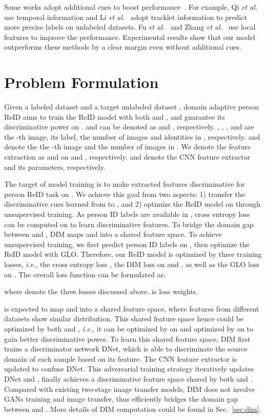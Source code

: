\documentclass[sigconf]{acmart}
\begin{document}
Some works adopt additional cues to boost performance~\cite{Qi_2019_ICCV, li2019unsupervised-pami, li2018unsupervised,ssg, Zhang_2019_ICCV}. For example, Qi \textit{et al.}~\cite{Qi_2019_ICCV} use temporal information and
Li \textit{et al.}~\cite{li2019unsupervised-pami, li2018unsupervised} adopt tracklet information to predict more precise labels on unlabeled datasets. Fu \textit{et al.}~\cite{ssg} and Zhang \textit{et al.}~\cite{Zhang_2019_ICCV} use local features to improve the performance. 
Experimental results show that our model outperforms these methods by a clear margin even without additional cues.



\section{Problem Formulation}
Given a labeled dataset  and a target unlabeled dataset , domain adaptive person ReID aims to train the ReID model with both  and , and guarantee its discriminative power on .  and  can be denoted as  and , respectively. , , , and  are the -th image, its label, the number of images and identities in , respectively.  and  denote the the -th image and the number of images in . We denote the feature extraction as  and  on  and , respectively.  and  denote the CNN feature extractor and its parameters, respectively.

The target of model training is to make extracted features discriminative for person ReID task on . We achieve this goal from two aspects: 1) transfer the discriminative cues learned from  to , and 2) optimize the ReID model on  through unsupervised training. As person ID labels are available in , cross entropy loss  can be computed on  to learn discriminative features. To bridge the domain gap between  and , DIM maps  and  into a shared feature space. To achieve unsupervised training, we first predict person ID labels on , then optimize the ReID model with GLO. Therefore, our ReID model is optimized by three training losses, \emph{i.e.}, the cross entropy loss , the DIM loss on  and , as well as the GLO loss on . The overall loss function can be formulated as:

where  denote the three losses discussed above.  is loss weights.


 is expected to map  and  into a shared feature space, where features from different datasets show similar distribution. This shared feature space hence could be optimized by both  and , \emph{i.e.}, it can be optimized by  on  and optimized by  on  to gain better discriminative power. To learn this shared feature space, DIM first trains a discriminator network DNet, which is able to discriminate the source domain of each sample based on its feature. The CNN feature extractor  is updated to confuse DNet. This adversarial training strategy iteratively updates DNet and , finally achieves a discriminative feature space shared by both  and . Compared with existing two-stage image transfer models, DIM does not involve GANs training and image transfer, thus efficiently bridges the domain gap between  and . More details of DIM computation could be found in Sec.~\ref{sec:dim}.
\end{document}
